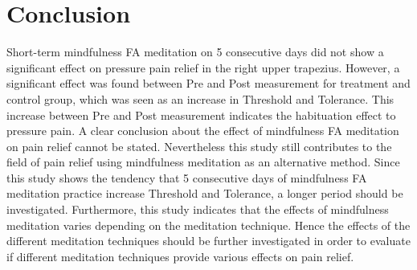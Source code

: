 \section{Conclusion}

Short-term mindfulness FA meditation on 5 consecutive days did not show a significant effect on pressure pain relief in the right upper trapezius. However, a significant effect was found between Pre and Post measurement for treatment and control group, which was seen as an increase in Threshold and Tolerance. This increase between Pre and Post measurement  indicates the habituation effect to pressure pain.
A clear conclusion about the effect of mindfulness FA meditation on pain relief cannot be stated. Nevertheless this study still contributes to the field of pain relief using mindfulness meditation as an alternative method. Since this study shows the tendency that 5 consecutive days of mindfulness FA meditation practice increase Threshold and Tolerance, a longer period should be investigated. Furthermore, this study indicates that the effects of mindfulness meditation varies depending on the meditation technique. Hence the effects of the different meditation techniques should be further investigated in order to evaluate if different meditation techniques provide various effects on pain relief.

